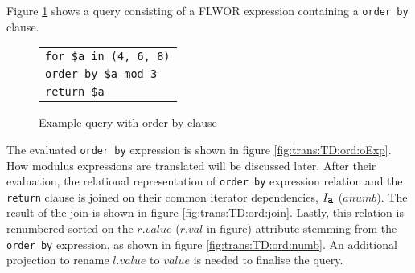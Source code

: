 \begin{myExample}
Figure \ref{fig:trans:TD:ordQu} shows a query consisting of a FLWOR expression containing a \texttt{order by} clause.
\begin{figure}[h]
\centering
\begin{tabular}{l}
\texttt{for \$a in (4, 6, 8)} \\
\texttt{order by \$a mod 3}\\
\texttt{return \$a}\\
\end{tabular}
\label{fig:trans:TD:ordQu}
\caption{Example query with order by clause}
\end{figure}

The evaluated \texttt{order by} expression is shown in figure \ref{fig:trans:TD:ord:oExp}. How modulus expressions
are translated will be discussed later. After their evaluation, the relational representation of \texttt{order by}
expression relation and the \texttt{return} clause is joined on their common iterator dependencies,
$I_{\mbox{\texttt{a}}}$ ($anumb$). The result of the join is shown in figure \ref{fig:trans:TD:ord:join}. Lastly,
this relation is renumbered sorted on the $r.value$ ($r.val$ in figure) attribute stemming from the \texttt{order by}
expression, as shown in figure \ref{fig:trans:TD:ord:numb}. An additional projection to rename $l.value$ to $value$
is needed to finalise the query.

\begin{figure}[h]
\centering
{}
\qquad
{}
\qquad
{}



\end{figure}
\end{myExample}
